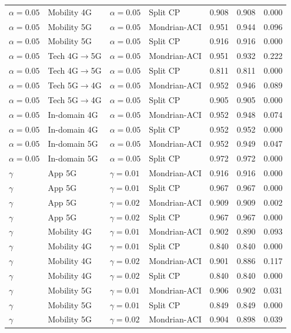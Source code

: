 \begin{table}[!t]
\begin{tabular}{llllrrr}
$\alpha=0.05$ & Mobility 4G & $\alpha=0.05$ & Split CP & 0.908 & 0.908 & 0.000 \\
$\alpha=0.05$ & Mobility 5G & $\alpha=0.05$ & Mondrian-ACI & 0.951 & 0.944 & 0.096 \\
$\alpha=0.05$ & Mobility 5G & $\alpha=0.05$ & Split CP & 0.916 & 0.916 & 0.000 \\
$\alpha=0.05$ & Tech 4G$\rightarrow$5G & $\alpha=0.05$ & Mondrian-ACI & 0.951 & 0.932 & 0.222 \\
$\alpha=0.05$ & Tech 4G$\rightarrow$5G & $\alpha=0.05$ & Split CP & 0.811 & 0.811 & 0.000 \\
$\alpha=0.05$ & Tech 5G$\rightarrow$4G & $\alpha=0.05$ & Mondrian-ACI & 0.952 & 0.946 & 0.089 \\
$\alpha=0.05$ & Tech 5G$\rightarrow$4G & $\alpha=0.05$ & Split CP & 0.905 & 0.905 & 0.000 \\
$\alpha=0.05$ & In-domain 4G & $\alpha=0.05$ & Mondrian-ACI & 0.952 & 0.948 & 0.074 \\
$\alpha=0.05$ & In-domain 4G & $\alpha=0.05$ & Split CP & 0.952 & 0.952 & 0.000 \\
$\alpha=0.05$ & In-domain 5G & $\alpha=0.05$ & Mondrian-ACI & 0.952 & 0.949 & 0.047 \\
$\alpha=0.05$ & In-domain 5G & $\alpha=0.05$ & Split CP & 0.972 & 0.972 & 0.000 \\
$\gamma$ & App 5G & $\gamma=0.01$ & Mondrian-ACI & 0.916 & 0.916 & 0.000 \\
$\gamma$ & App 5G & $\gamma=0.01$ & Split CP & 0.967 & 0.967 & 0.000 \\
$\gamma$ & App 5G & $\gamma=0.02$ & Mondrian-ACI & 0.909 & 0.909 & 0.002 \\
$\gamma$ & App 5G & $\gamma=0.02$ & Split CP & 0.967 & 0.967 & 0.000 \\
$\gamma$ & Mobility 4G & $\gamma=0.01$ & Mondrian-ACI & 0.902 & 0.890 & 0.093 \\
$\gamma$ & Mobility 4G & $\gamma=0.01$ & Split CP & 0.840 & 0.840 & 0.000 \\
$\gamma$ & Mobility 4G & $\gamma=0.02$ & Mondrian-ACI & 0.901 & 0.886 & 0.117 \\
$\gamma$ & Mobility 4G & $\gamma=0.02$ & Split CP & 0.840 & 0.840 & 0.000 \\
$\gamma$ & Mobility 5G & $\gamma=0.01$ & Mondrian-ACI & 0.906 & 0.902 & 0.031 \\
$\gamma$ & Mobility 5G & $\gamma=0.01$ & Split CP & 0.849 & 0.849 & 0.000 \\
$\gamma$ & Mobility 5G & $\gamma=0.02$ & Mondrian-ACI & 0.904 & 0.898 & 0.039 \\

\end{tabular}
\end{table}
